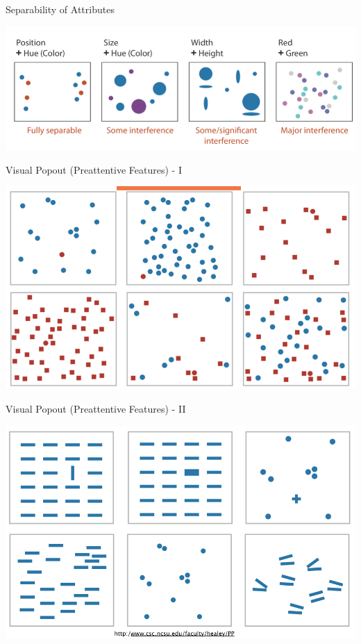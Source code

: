 \documentclass{beamer}
\begin{document}
\begin{frame}{Separability of Attributes}
    \begin{center}
        \includegraphics[scale=0.3]{separabilityOfAttributes.png}
    \end{center}
\end{frame}  
\begin{frame}{Visual Popout (Preattentive Features) - I}
    \begin{center}
        \includegraphics[scale=0.3]{preAttentiveFeatures.png}
    \end{center}
\end{frame}  
\begin{frame}{Visual Popout (Preattentive Features) - II}
    \begin{center}
        \includegraphics[scale=0.3]{preAttentiveFeatures2.png}
    \end{center}
\end{frame}  
\end{document}
